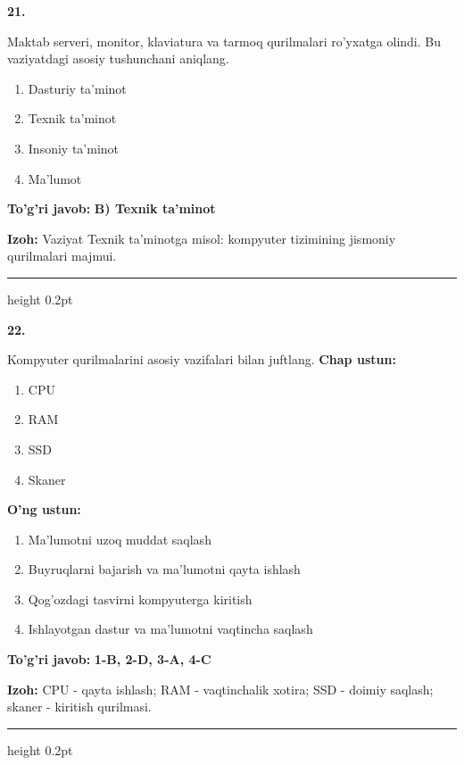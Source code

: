 \documentclass[10pt,a4paper]{article}
\begin{document}
{\bfseries\sffamily\color{ink} 21.}
\par
Maktab serveri, monitor, klaviatura va tarmoq qurilmalari ro'yxatga olindi. Bu vaziyatdagi asosiy tushunchani aniqlang.
\begin{enumerate}[label=\Alph*),leftmargin=9mm]
\item Dasturiy ta'minot
\item Texnik ta'minot
\item Insoniy ta'minot
\item Ma'lumot
\end{enumerate}
\begin{tcolorbox}[enhanced,breakable,colback=teal!4,colframe=teal!60!black,boxrule=0.45pt,arc=1.2mm,left=2.7mm,right=2.7mm,top=1.8mm,bottom=1.8mm,before skip=2mm,after skip=2mm]
{\bfseries\sffamily\color{teal}To'g'ri javob:} \textbf{B) Texnik ta'minot}
\par\smallskip
{\bfseries Izoh:} Vaziyat Texnik ta'minotga misol: kompyuter tizimining jismoniy qurilmalari majmui.
\end{tcolorbox}
\vspace{2mm}\hrule height 0.2pt\vspace{3mm}

{\bfseries\sffamily\color{ink} 22.}
\par
Kompyuter qurilmalarini asosiy vazifalari bilan juftlang.
\textbf{Chap ustun:}
\begin{enumerate}[label=\arabic*),leftmargin=9mm]
\item CPU
\item RAM
\item SSD
\item Skaner
\end{enumerate}
\textbf{O'ng ustun:}
\begin{enumerate}[label=\Alph*),leftmargin=9mm]
\item Ma'lumotni uzoq muddat saqlash
\item Buyruqlarni bajarish va ma'lumotni qayta ishlash
\item Qog'ozdagi tasvirni kompyuterga kiritish
\item Ishlayotgan dastur va ma'lumotni vaqtincha saqlash
\end{enumerate}
\begin{tcolorbox}[enhanced,breakable,colback=teal!4,colframe=teal!60!black,boxrule=0.45pt,arc=1.2mm,left=2.7mm,right=2.7mm,top=1.8mm,bottom=1.8mm,before skip=2mm,after skip=2mm]
{\bfseries\sffamily\color{teal}To'g'ri javob:} \textbf{1-B, 2-D, 3-A, 4-C}
\par\smallskip
{\bfseries Izoh:} CPU - qayta ishlash; RAM - vaqtinchalik xotira; SSD - doimiy saqlash; skaner - kiritish qurilmasi.
\end{tcolorbox}
\vspace{2mm}\hrule height 0.2pt\vspace{3mm}
\end{document}
